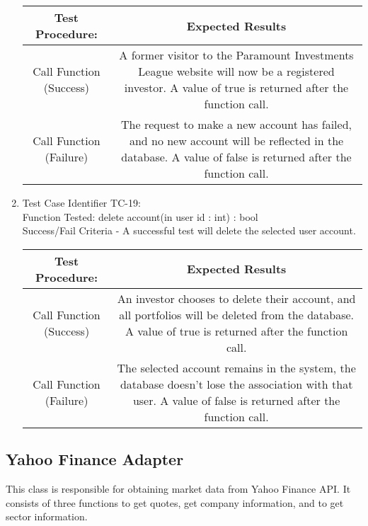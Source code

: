 \begin{enumerate}
\begin{tabular}{| c | c |}
    \hline
    \textbf{Test Procedure:} & \textbf{Expected Results} \\ \hline
    Call Function (Success) & A former visitor to the Paramount Investments
    League website will now be a registered investor.  A value of true is
    returned after the function call.
    \\ \hline
    Call Function (Failure) & The request to make a new account has failed, and
    no new account will be reflected in the database. A value of false is
    returned after the function call.\\ \hline
    \end{tabular}
  \item
  Test Case Identifier TC-19:\\
    Function Tested: delete account(in user id : int) : bool \\
    Success/Fail Criteria - A successful test will delete the selected user
    account. \\
    \begin{tabular}{| c | c |}
    \hline
    \textbf{Test Procedure:} & \textbf{Expected Results} \\ \hline
    Call Function (Success) & An investor chooses to delete their account, and
    all portfolios will be deleted from the database.  A value of true is
    returned after the function call.
    \\ \hline
    Call Function (Failure) & The selected account remains in the system, the
    database doesn’t lose the association with that user. A value of false is
    returned after the function call.\\ \hline
    \end{tabular}

\end{enumerate}

\subsection{Yahoo Finance Adapter}

This class is responsible for obtaining market data from Yahoo Finance API. It
consists of three functions to get quotes, get company information, and to get
sector information.\\

